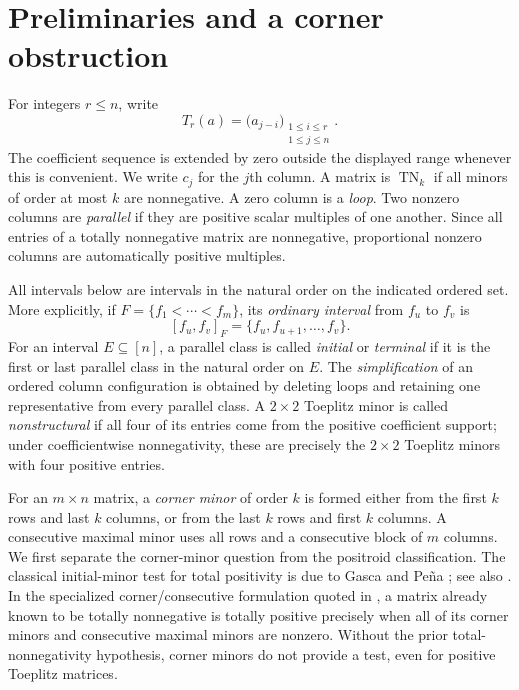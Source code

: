 \documentclass{amsart}
\numberwithin{equation}{section}
\theoremstyle{definition}
\theoremstyle{remark}
\DeclareMathOperator{\TN}{TN}
\begin{document}
\section{Preliminaries and a corner obstruction}

For integers $r\le n$, write
\begin{equation}\label{eq:toeplitz}
 T_r(a)=\bigl(a_{j-i}\bigr)_{\substack{1\le i\le r\\1\le j\le n}}.
\end{equation}
The coefficient sequence is extended by zero outside the displayed range whenever this is convenient.  We write $c_j$ for the $j$th column.  A matrix is $\TN_k$ if all minors of order at most $k$ are nonnegative.  A zero column is a \emph{loop}.  Two nonzero columns are \emph{parallel} if they are positive scalar multiples of one another.  Since all entries of a totally nonnegative matrix are nonnegative, proportional nonzero columns are automatically positive multiples.

All intervals below are intervals in the natural order on the indicated ordered set.  More explicitly, if $F=\{f_1<\cdots<f_m\}$, its \emph{ordinary interval} from $f_u$ to $f_v$ is
\[
 [f_u,f_v]_F=\{f_u,f_{u+1},\ldots,f_v\}.
\]
For an interval $E\subseteq[n]$, a parallel class is called \emph{initial} or \emph{terminal} if it is the first or last parallel class in the natural order on $E$.  The \emph{simplification} of an ordered column configuration is obtained by deleting loops and retaining one representative from every parallel class.  A $2\times2$ Toeplitz minor is called \emph{nonstructural} if all four of its entries come from the positive coefficient support; under coefficientwise nonnegativity, these are precisely the $2\times2$ Toeplitz minors with four positive entries.

For an $m\times n$ matrix, a \emph{corner minor} of order $k$ is formed either from the first $k$ rows and last $k$ columns, or from the last $k$ rows and first $k$ columns.  A consecutive maximal minor uses all rows and a consecutive block of $m$ columns.  We first separate the corner-minor question from the positroid classification.  The classical initial-minor test for total positivity is due to Gasca and Pe\~na \cite{GascaPena}; see also \cite{FJ}.  In the specialized corner/consecutive formulation quoted in \cite{McDaniel}, a matrix already known to be totally nonnegative is totally positive precisely when all of its corner minors and consecutive maximal minors are nonzero.  Without the prior total-nonnegativity hypothesis, corner minors do not provide a test, even for positive Toeplitz matrices.
\end{document}

